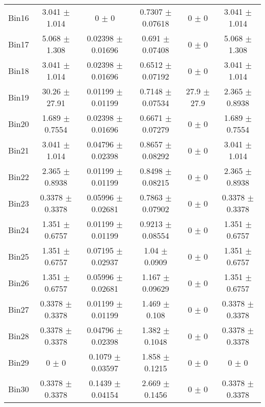 \begin{tabular}{@{\extracolsep{4pt}}lccccc@{}}
     Bin16 & 3.041 $\pm$ 1.014 & 0 $\pm$ 0 & 0.7307 $\pm$ 0.07618 & 0 $\pm$ 0 & 3.041 $\pm$ 1.014 \\ 
     Bin17 & 5.068 $\pm$ 1.308 & 0.02398 $\pm$ 0.01696 & 0.691 $\pm$ 0.07408 & 0 $\pm$ 0 & 5.068 $\pm$ 1.308 \\ 
     Bin18 & 3.041 $\pm$ 1.014 & 0.02398 $\pm$ 0.01696 & 0.6512 $\pm$ 0.07192 & 0 $\pm$ 0 & 3.041 $\pm$ 1.014 \\ 
     Bin19 & 30.26 $\pm$ 27.91 & 0.01199 $\pm$ 0.01199 & 0.7148 $\pm$ 0.07534 & 27.9 $\pm$ 27.9 & 2.365 $\pm$ 0.8938 \\ 
     Bin20 & 1.689 $\pm$ 0.7554 & 0.02398 $\pm$ 0.01696 & 0.6671 $\pm$ 0.07279 & 0 $\pm$ 0 & 1.689 $\pm$ 0.7554 \\ 
     Bin21 & 3.041 $\pm$ 1.014 & 0.04796 $\pm$ 0.02398 & 0.8657 $\pm$ 0.08292 & 0 $\pm$ 0 & 3.041 $\pm$ 1.014 \\ 
     Bin22 & 2.365 $\pm$ 0.8938 & 0.01199 $\pm$ 0.01199 & 0.8498 $\pm$ 0.08215 & 0 $\pm$ 0 & 2.365 $\pm$ 0.8938 \\ 
     Bin23 & 0.3378 $\pm$ 0.3378 & 0.05996 $\pm$ 0.02681 & 0.7863 $\pm$ 0.07902 & 0 $\pm$ 0 & 0.3378 $\pm$ 0.3378 \\ 
     Bin24 & 1.351 $\pm$ 0.6757 & 0.01199 $\pm$ 0.01199 & 0.9213 $\pm$ 0.08554 & 0 $\pm$ 0 & 1.351 $\pm$ 0.6757 \\ 
     Bin25 & 1.351 $\pm$ 0.6757 & 0.07195 $\pm$ 0.02937 & 1.04 $\pm$ 0.0909 & 0 $\pm$ 0 & 1.351 $\pm$ 0.6757 \\ 
     Bin26 & 1.351 $\pm$ 0.6757 & 0.05996 $\pm$ 0.02681 & 1.167 $\pm$ 0.09629 & 0 $\pm$ 0 & 1.351 $\pm$ 0.6757 \\ 
     Bin27 & 0.3378 $\pm$ 0.3378 & 0.01199 $\pm$ 0.01199 & 1.469 $\pm$ 0.108 & 0 $\pm$ 0 & 0.3378 $\pm$ 0.3378 \\ 
     Bin28 & 0.3378 $\pm$ 0.3378 & 0.04796 $\pm$ 0.02398 & 1.382 $\pm$ 0.1048 & 0 $\pm$ 0 & 0.3378 $\pm$ 0.3378 \\ 
     Bin29 & 0 $\pm$ 0 & 0.1079 $\pm$ 0.03597 & 1.858 $\pm$ 0.1215 & 0 $\pm$ 0 & 0 $\pm$ 0 \\ 
     Bin30 & 0.3378 $\pm$ 0.3378 & 0.1439 $\pm$ 0.04154 & 2.669 $\pm$ 0.1456 & 0 $\pm$ 0 & 0.3378 $\pm$ 0.3378 \\ 
\hline\hline
  \end{tabular}
